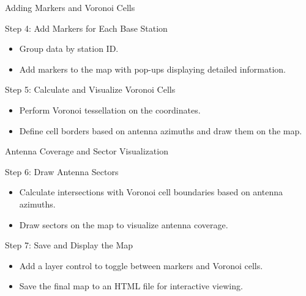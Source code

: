\begin{frame}{Adding Markers and Voronoi Cells}
    \begin{block}{Step 4: Add Markers for Each Base Station}
        \begin{itemize}
            \item Group data by station ID.
            \item Add markers to the map with pop-ups displaying detailed information.
        \end{itemize}
    \end{block}
    \begin{block}{Step 5: Calculate and Visualize Voronoi Cells}
        \begin{itemize}
            \item Perform Voronoi tessellation on the coordinates.
            \item Define cell borders based on antenna azimuths and draw them on the map.
        \end{itemize}
    \end{block}
\end{frame}
    
\begin{frame}{Antenna Coverage and Sector Visualization}
    \begin{block}{Step 6: Draw Antenna Sectors}
        \begin{itemize}
            \item Calculate intersections with Voronoi cell boundaries based on antenna azimuths.
            \item Draw sectors on the map to visualize antenna coverage.
        \end{itemize}
    \end{block}
    \begin{block}{Step 7: Save and Display the Map}
        \begin{itemize}
            \item Add a layer control to toggle between markers and Voronoi cells.
            \item Save the final map to an HTML file for interactive viewing.
        \end{itemize}
    \end{block}
\end{frame}

